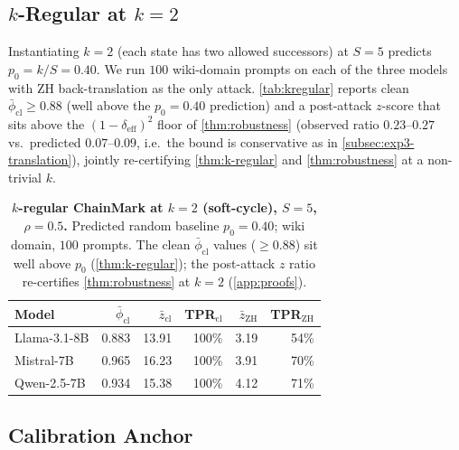 \subsection{$k$-Regular at $k{=}2$}
\label{subsec:exp4-kregular}

Instantiating $k = 2$ (each state has two allowed successors) at
$S = 5$ predicts $p_0 = k/S = 0.40$. We run $100$ wiki-domain prompts
on each of the three models with ZH back-translation as the only
attack. \autoref{tab:kregular} reports clean
$\bar\phi_{\mathrm{cl}} \geq 0.88$ (well above the $p_0 = 0.40$
prediction) and a post-attack $z$-score that sits above the
$(1 - \delta_{\mathrm{eff}})^2$ floor of \autoref{thm:robustness}
(observed ratio $0.23$--$0.27$ vs.\ predicted $0.07$--$0.09$, i.e.\
the bound is conservative as in \autoref{subsec:exp3-translation}),
jointly re-certifying
\autoref{thm:k-regular} and \autoref{thm:robustness} at a non-trivial
$k$.

\begin{table}[t]
  \centering
  \caption{\textbf{$k$-regular ChainMark at $k{=}2$ (soft-cycle), $S{=}5$,
    $\rho{=}0.5$.} Predicted random baseline $p_0 = 0.40$; wiki domain,
    $100$ prompts. The clean $\bar\phi_{\mathrm{cl}}$ values
    ($\geq 0.88$) sit well above $p_0$
    (\autoref{thm:k-regular}); the post-attack $z$ ratio re-certifies
    \autoref{thm:robustness} at $k{=}2$ (\autoref{app:proofs}).}
  \label{tab:kregular}
  \small
  \setlength{\tabcolsep}{3.5pt}
  \begin{tabular}{lrrrrr}
    \toprule
    Model & $\bar\phi_{\mathrm{cl}}$ & $\bar z_{\mathrm{cl}}$ & TPR$_{\mathrm{cl}}$
          & $\bar z_{\mathrm{ZH}}$ & TPR$_{\mathrm{ZH}}$ \\
    \midrule
    Llama-3.1-8B & 0.883 & 13.91 & 100\% & 3.19 & 54\% \\
    Mistral-7B   & 0.965 & 16.23 & 100\% & 3.91 & 70\% \\
    Qwen-2.5-7B  & 0.934 & 15.38 & 100\% & 4.12 & 71\% \\
    \bottomrule
  \end{tabular}
\end{table}

\subsection{Calibration Anchor}
\label{subsec:exp5-calibration}

